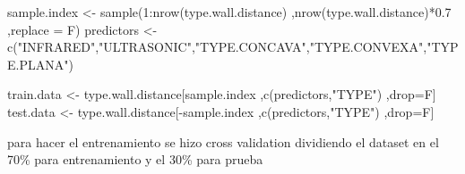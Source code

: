 \documentclass[
]{article}
\newenvironment{Shaded}{\begin{snugshade}}{\end{snugshade}}
\newcommand{\AttributeTok}[1]{\textcolor[rgb]{0.77,0.63,0.00}{#1}}
\newcommand{\CommentTok}[1]{\textcolor[rgb]{0.56,0.35,0.01}{\textit{#1}}}
\newcommand{\DecValTok}[1]{\textcolor[rgb]{0.00,0.00,0.81}{#1}}
\newcommand{\DocumentationTok}[1]{\textcolor[rgb]{0.56,0.35,0.01}{\textbf{\textit{#1}}}}
\newcommand{\FloatTok}[1]{\textcolor[rgb]{0.00,0.00,0.81}{#1}}
\newcommand{\FunctionTok}[1]{\textcolor[rgb]{0.00,0.00,0.00}{#1}}
\newcommand{\NormalTok}[1]{#1}
\newcommand{\OtherTok}[1]{\textcolor[rgb]{0.56,0.35,0.01}{#1}}
\newcommand{\SpecialCharTok}[1]{\textcolor[rgb]{0.00,0.00,0.00}{#1}}
\newcommand{\StringTok}[1]{\textcolor[rgb]{0.31,0.60,0.02}{#1}}
\begin{document}
\begin{Shaded}
\begin{Highlighting}[]
\NormalTok{sample.index }\OtherTok{\textless{}{-}} \FunctionTok{sample}\NormalTok{(}\DecValTok{1}\SpecialCharTok{:}\FunctionTok{nrow}\NormalTok{(type.wall.distance)}
\NormalTok{                       ,}\FunctionTok{nrow}\NormalTok{(type.wall.distance)}\SpecialCharTok{*}\FloatTok{0.7}
\NormalTok{                       ,}\AttributeTok{replace =}\NormalTok{ F)}
\NormalTok{predictors }\OtherTok{\textless{}{-}} \FunctionTok{c}\NormalTok{(}\StringTok{"INFRARED"}\NormalTok{,}\StringTok{"ULTRASONIC"}\NormalTok{,}\StringTok{"TYPE.CONCAVA"}\NormalTok{,}\StringTok{"TYPE.CONVEXA"}\NormalTok{,}\StringTok{"TYPE.PLANA"}\NormalTok{)}


\NormalTok{train.data  }\OtherTok{\textless{}{-}}\NormalTok{  type.wall.distance[sample.index}
\NormalTok{                                   ,}\FunctionTok{c}\NormalTok{(predictors,}\StringTok{"TYPE"}\NormalTok{)}
\NormalTok{                                   ,drop}\OtherTok{=}\NormalTok{F]}
\NormalTok{test.data  }\OtherTok{\textless{}{-}}\NormalTok{  type.wall.distance[}\SpecialCharTok{{-}}\NormalTok{sample.index}
\NormalTok{                                   ,}\FunctionTok{c}\NormalTok{(predictors,}\StringTok{"TYPE"}\NormalTok{)}
\NormalTok{                                   ,drop}\OtherTok{=}\NormalTok{F]}
\end{Highlighting}
\end{Shaded}

para hacer el entrenamiento se hizo cross validation dividiendo el
dataset en el 70\% para entrenamiento y el 30\% para prueba

\begin{Shaded}
\end{Shaded}
\end{document}
